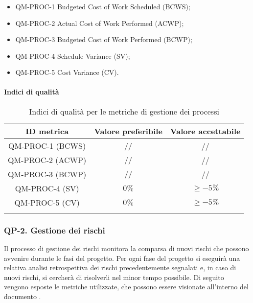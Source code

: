 			\begin{itemize}
				\item QM-PROC-1 Budgeted Cost of Work Scheduled (BCWS);
				\item QM-PROC-2 Actual Cost of Work Performed (ACWP);
				\item QM-PROC-3 Budgeted Cost of Work Performed (BCWP);
				\item QM-PROC-4 Schedule Variance (SV);
				\item QM-PROC-5 Cost Variance (CV).
			\end{itemize}

		\paragraph{Indici di qualità}

			\begin{center}
				\begin{longtable}{|c|c|c|}
				\hline
				\rowcolor{lighter-grayer}
				\textbf{ID metrica} & \textbf{Valore preferibile} & \textbf{Valore accettabile}\\
				\hline
				\endfirsthead
				\hline
				QM-PROC-1 (BCWS) & // & // \\
				\hline
				QM-PROC-2 (ACWP) & // & // \\
				\hline
				QM-PROC-3 (BCWP) & // & // \\
				\hline
				QM-PROC-4 (SV) & \(0\%\) & \(\ge -5\%\) \\
				\hline
				QM-PROC-5 (CV) & \(0\%\) & \(\ge -5\%\) \\
				\hline
				\caption{Indici di qualità per le metriche di gestione dei processi}
				\end{longtable}
			\end{center}

	\subsubsection{QP-2. Gestione dei rischi}

		Il processo di gestione dei rischi monitora la comparsa di nuovi rischi che possono avvenire durante le fasi del progetto.
		Per ogni fase del progetto si eseguirà una relativa analisi retrospettiva dei rischi precedentemente segnalati e, in caso di nuovi rischi, si cercherà di risolverli nel minor tempo possibile.
		Di seguito vengono esposte le metriche utilizzate, che possono essere visionate all'interno del documento .

